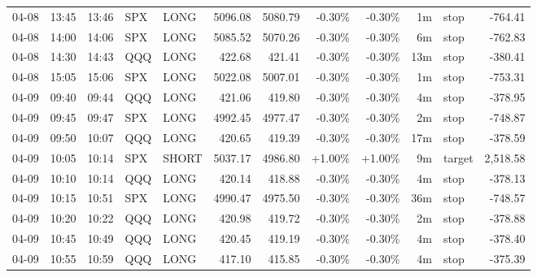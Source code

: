 \documentclass[11pt,a4paper]{article}
\begin{document}
\begin{center}
\begin{longtable}{>{\color{txtmain}}l l l l l r r r r r >{\color{txtmain}}l r}
04-08 & 13:45 & 13:46 & SPX & LONG & 5096.08 & 5080.79 & \textcolor{lossred}{-0.30\%} & \textcolor{lossred}{-0.30\%} & 1m & stop & \textcolor{lossred}{-764.41} \\
04-08 & 14:00 & 14:06 & SPX & LONG & 5085.52 & 5070.26 & \textcolor{lossred}{-0.30\%} & \textcolor{lossred}{-0.30\%} & 6m & stop & \textcolor{lossred}{-762.83} \\
04-08 & 14:30 & 14:43 & QQQ & LONG & 422.68 & 421.41 & \textcolor{lossred}{-0.30\%} & \textcolor{lossred}{-0.30\%} & 13m & stop & \textcolor{lossred}{-380.41} \\
04-08 & 15:05 & 15:06 & SPX & LONG & 5022.08 & 5007.01 & \textcolor{lossred}{-0.30\%} & \textcolor{lossred}{-0.30\%} & 1m & stop & \textcolor{lossred}{-753.31} \\
04-09 & 09:40 & 09:44 & QQQ & LONG & 421.06 & 419.80 & \textcolor{lossred}{-0.30\%} & \textcolor{lossred}{-0.30\%} & 4m & stop & \textcolor{lossred}{-378.95} \\
04-09 & 09:45 & 09:47 & SPX & LONG & 4992.45 & 4977.47 & \textcolor{lossred}{-0.30\%} & \textcolor{lossred}{-0.30\%} & 2m & stop & \textcolor{lossred}{-748.87} \\
04-09 & 09:50 & 10:07 & QQQ & LONG & 420.65 & 419.39 & \textcolor{lossred}{-0.30\%} & \textcolor{lossred}{-0.30\%} & 17m & stop & \textcolor{lossred}{-378.59} \\
04-09 & 10:05 & 10:14 & SPX & SHORT & 5037.17 & 4986.80 & \textcolor{wingreen}{+1.00\%} & \textcolor{wingreen}{+1.00\%} & 9m & target & \textcolor{wingreen}{2,518.58} \\
04-09 & 10:10 & 10:14 & QQQ & LONG & 420.14 & 418.88 & \textcolor{lossred}{-0.30\%} & \textcolor{lossred}{-0.30\%} & 4m & stop & \textcolor{lossred}{-378.13} \\
04-09 & 10:15 & 10:51 & SPX & LONG & 4990.47 & 4975.50 & \textcolor{lossred}{-0.30\%} & \textcolor{lossred}{-0.30\%} & 36m & stop & \textcolor{lossred}{-748.57} \\
04-09 & 10:20 & 10:22 & QQQ & LONG & 420.98 & 419.72 & \textcolor{lossred}{-0.30\%} & \textcolor{lossred}{-0.30\%} & 2m & stop & \textcolor{lossred}{-378.88} \\
04-09 & 10:45 & 10:49 & QQQ & LONG & 420.45 & 419.19 & \textcolor{lossred}{-0.30\%} & \textcolor{lossred}{-0.30\%} & 4m & stop & \textcolor{lossred}{-378.40} \\
04-09 & 10:55 & 10:59 & QQQ & LONG & 417.10 & 415.85 & \textcolor{lossred}{-0.30\%} & \textcolor{lossred}{-0.30\%} & 4m & stop & \textcolor{lossred}{-375.39} \\

\end{longtable}
\end{center}
\end{document}
